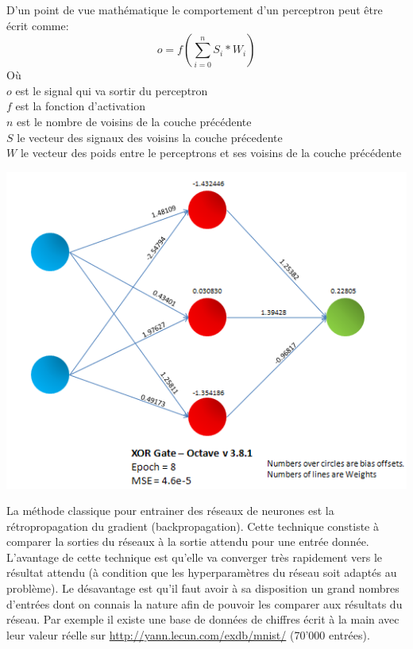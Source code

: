 \documentclass{article}
\begin{document}
D'un point de vue mathématique le comportement d'un perceptron peut être écrit comme:
\begin{equation}
o = f(\sum_{i=0}^{n} S_i * W_i)
\end{equation}
Où\\
$o$ est le signal qui va sortir du perceptron\\
$f$ est la fonction d'activation\\
$n$ est le nombre de voisins de la couche précédente\\
$S$ le vecteur des signaux des voisins la couche précedente\\
$W$ le vecteur des poids entre le perceptrons et ses voisins de la couche précédente

\begin{center}
\includegraphics[scale=0.5]{XOR_Gate.png}
\end{center}

La méthode classique pour entrainer des réseaux de neurones est la rétropropagation du gradient (backpropagation). Cette technique constiste à comparer la sorties du réseaux à la sortie attendu pour une entrée donnée. L'avantage de cette technique est qu'elle va converger très rapidement vers le résultat attendu (à condition que les hyperparamètres du réseau soit adaptés au problème). Le désavantage est qu'il faut avoir à sa disposition un grand nombres d'entrées dont on connais la nature afin de pouvoir les comparer aux résultats du réseau. Par exemple il existe une base de données de chiffres écrit à la main avec leur valeur réelle sur \url{http://yann.lecun.com/exdb/mnist/} (70'000 entrées).\\
\end{document}
